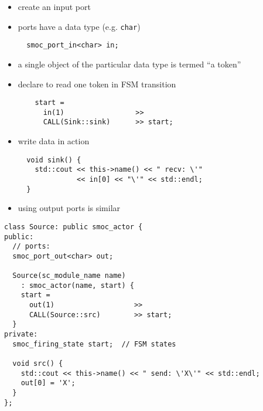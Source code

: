 \begin{frame}[fragile=singleslide]
\begin{itemize}
\item create an input port
\item ports have a data type (e.g. \lstinline!char!)
\begin{lstlisting}
  smoc_port_in<char> in;
\end{lstlisting}
\item a single object of the particular data type is termed ``a token''
\item declare to read one token in FSM transition
\begin{lstlisting}
    start =
      in(1)                 >>
      CALL(Sink::sink)      >> start;
\end{lstlisting}
\item write data in action
\begin{lstlisting}
  void sink() {
    std::cout << this->name() << " recv: \'"
              << in[0] << "\'" << std::endl;
  }
\end{lstlisting}
\end{itemize}
\end{frame}




\begin{frame}[fragile=singleslide]
\begin{itemize}
\item using output ports is similar
\end{itemize}
\begin{lstlisting}
class Source: public smoc_actor {
public:
  // ports:
  smoc_port_out<char> out;

  Source(sc_module_name name)
    : smoc_actor(name, start) {
    start = 
      out(1)                   >>
      CALL(Source::src)        >> start;
  }
private:
  smoc_firing_state start;  // FSM states

  void src() {
    std::cout << this->name() << " send: \'X\'" << std::endl;
    out[0] = 'X';
  }
};
\end{lstlisting}
\end{frame}






